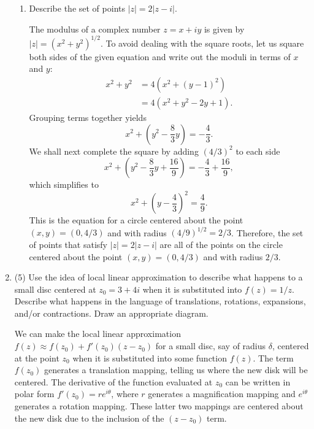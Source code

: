 \documentclass[11pt]{article}
\begin{document}
\begin{enumerate}
\begin{enumerate}
  \item Describe the set of points $|z| = 2|z - i|$.

  \begin{mdframed}
  The modulus of a complex number $z = x + iy$ is given by $|z| = (x^2 + y^2)^{1/2}$. To avoid dealing with the square roots, let us square both sides of the given equation and write out the moduli in terms of $x$ and $y$:
  \begin{align*}
    x^2 + y^2 &= 4(x^2 + (y-1)^2) \\
    &= 4(x^2 + y^2 - 2y + 1).
  \end{align*}
  Grouping terms together yields
  \begin{equation*}
    x^2 + \left(y^2 - \frac{8}{3}y\right) = -\frac{4}{3}.
  \end{equation*}
  We shall next complete the square by adding $(4/3)^2$ to each side
  \begin{equation*}
    x^2 + \left(y^2 - \frac{8}{3}y + \frac{16}{9}\right) = -\frac{4}{3} + \frac{16}{9},
  \end{equation*}
  which simplifies to
  \begin{equation*}
    x^2 + \left(y - \frac{4}{3}\right)^2 = \frac{4}{9}.
  \end{equation*}
  This is the equation for a circle centered about the point $(x,y) = (0,4/3)$ and with radius $(4/9)^{1/2} = 2/3$. Therefore, the set of points that satisfy $|z| = 2|z - i|$ are all of the points on the circle centered about the point $(x,y) = (0,4/3)$ and with radius $2/3$.
  \end{mdframed}
  
  \end{enumerate}

\item (5) Use the idea of local linear approximation to describe what happens to a small disc centered at $z_0 = 3 + 4i$ when it is substituted into $f(z) = 1/z$. Describe what happens in the language of translations, rotations, expansions, and/or contractions. Draw an appropriate diagram.

\begin{mdframed}
  We can make the local linear approximation $f(z) \approx f(z_0) + f'(z_0)(z-z_0)$ for a small disc, say of radius $\delta$, centered at the point $z_0$ when it is substituted into some function $f(z)$. The term $f(z_0)$ generates a translation mapping, telling us where the new disk will be centered. The derivative of the function evaluated at $z_0$ can be written in polar form $f'(z_0) = re^{i\theta}$, where $r$ generates a magnification mapping and $e^{i\theta}$ generates a rotation mapping. These latter two mappings are centered about the new disk due to the inclusion of the $(z-z_0)$ term.


\end{mdframed}
\end{enumerate}
\end{document}
